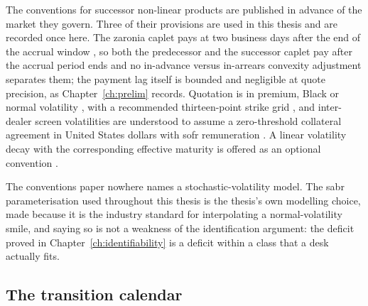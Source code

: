 \documentclass[../../../main.tex]{subfiles}
\begin{document}
The conventions for successor non-linear products are published in advance of the market they govern. Three of their provisions are used in this thesis and are recorded once here. The \gls{zaronia} caplet pays at two business days after the end of the accrual window \citep[\S7.6, p.~24; \S6.1, p.~8]{sarb2024conv}, so both the predecessor and the successor caplet pay after the accrual period ends and no in-advance versus in-arrears convexity adjustment separates them; the payment lag itself is bounded and negligible at quote precision, as Chapter~\ref{ch:prelim} records. Quotation is in premium, Black or normal volatility \citep[\S8, p.~26]{sarb2024conv}, with a recommended thirteen-point strike grid \citep[\S7.6, p.~25]{sarb2024conv}, and inter-dealer screen volatilities are understood to assume a zero-threshold collateral agreement in United States dollars with \gls{sofr} remuneration \citep[\S8.2, p.~27]{sarb2024conv}. A linear volatility decay with the corresponding effective maturity is offered as an optional convention \citep[\S8.3.1, p.~28; \S8.3.2, eqs.~(15)--(16), p.~29]{sarb2024conv}.

The conventions paper nowhere names a stochastic-volatility model. The \gls{sabr} parameterisation used throughout this thesis is the thesis's own modelling choice, made because it is the industry standard for interpolating a normal-volatility smile, and saying so is not a weakness of the identification argument: the deficit proved in Chapter~\ref{ch:identifiability} is a deficit within a class that a desk actually fits.

\subsection{The transition calendar}
\end{document}
